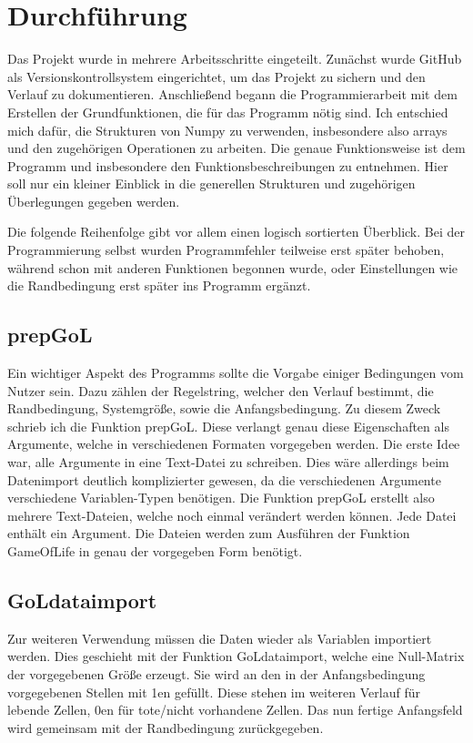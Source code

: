\documentclass{scrartcl}
\begin{document}
\section{Durchführung}
Das Projekt wurde in mehrere Arbeitsschritte eingeteilt. Zunächst wurde GitHub als Versionskontrollsystem eingerichtet, um das Projekt zu sichern und den Verlauf zu dokumentieren. Anschließend begann die Programmierarbeit mit dem Erstellen der Grundfunktionen, die für das Programm nötig sind. Ich entschied mich dafür, die Strukturen von Numpy zu verwenden, insbesondere also arrays und den zugehörigen Operationen zu arbeiten. Die genaue Funktionsweise ist dem Programm und insbesondere den Funktionsbeschreibungen zu entnehmen. Hier soll nur ein kleiner Einblick in die generellen Strukturen und zugehörigen Überlegungen gegeben werden.

Die folgende Reihenfolge gibt vor allem einen logisch sortierten Überblick. Bei der Programmierung selbst wurden Programmfehler teilweise erst später behoben, während schon mit anderen Funktionen begonnen wurde, oder Einstellungen wie die Randbedingung erst später ins Programm ergänzt.
\subsection{prepGoL}
Ein wichtiger Aspekt des Programms sollte die Vorgabe einiger Bedingungen vom Nutzer sein. Dazu zählen der Regelstring, welcher den Verlauf bestimmt, die Randbedingung, Systemgröße, sowie die Anfangsbedingung. Zu diesem Zweck schrieb ich die Funktion prepGoL. Diese verlangt genau diese Eigenschaften als Argumente, welche in verschiedenen Formaten vorgegeben werden. Die erste Idee war, alle Argumente in eine Text-Datei zu schreiben. Dies wäre allerdings beim Datenimport deutlich komplizierter gewesen, da die verschiedenen Argumente verschiedene Variablen-Typen benötigen. Die Funktion prepGoL erstellt also mehrere Text-Dateien, welche noch einmal verändert werden können. Jede Datei enthält ein Argument. Die Dateien werden zum Ausführen der Funktion GameOfLife in genau der vorgegeben Form benötigt.
\subsection{GoLdataimport}
Zur weiteren Verwendung müssen die Daten wieder als Variablen importiert werden. Dies geschieht mit der Funktion GoLdataimport, welche eine Null-Matrix der vorgegebenen Größe erzeugt. Sie wird an den in der Anfangsbedingung vorgegebenen Stellen mit 1en gefüllt. Diese stehen im weiteren Verlauf für lebende Zellen, 0en für tote/nicht vorhandene Zellen. Das nun fertige Anfangsfeld wird gemeinsam mit der Randbedingung zurückgegeben.
\end{document}
